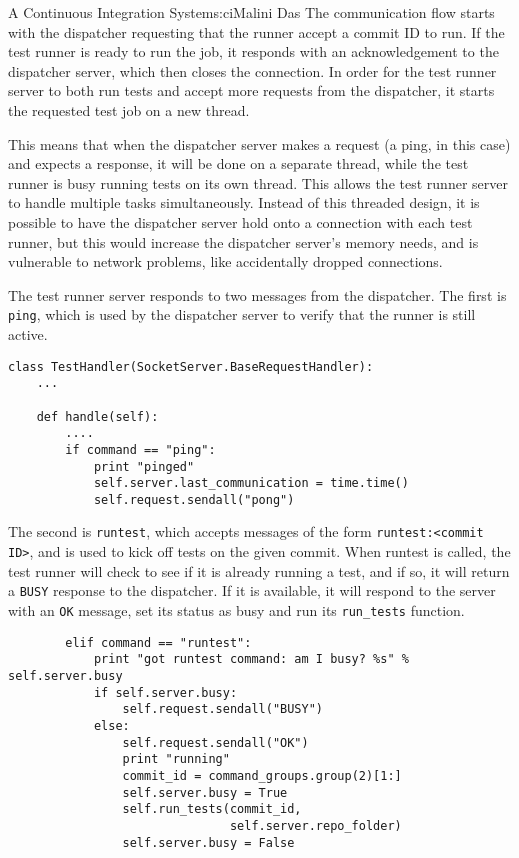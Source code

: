 \begin{aosachapter}{A Continuous Integration System}{s:ci}{Malini Das}
The communication flow starts with the dispatcher requesting that the
runner accept a commit ID to run. If the test runner is ready to run the
job, it responds with an acknowledgement to the dispatcher server, which
then closes the connection. In order for the test runner server to both
run tests and accept more requests from the dispatcher, it starts the
requested test job on a new thread.

This means that when the dispatcher server makes a request (a ping, in
this case) and expects a response, it will be done on a separate thread,
while the test runner is busy running tests on its own thread. This
allows the test runner server to handle multiple tasks simultaneously.
Instead of this threaded design, it is possible to have the dispatcher
server hold onto a connection with each test runner, but this would
increase the dispatcher server's memory needs, and is vulnerable to
network problems, like accidentally dropped connections.

The test runner server responds to two messages from the dispatcher. The
first is \texttt{ping}, which is used by the dispatcher server to verify
that the runner is still active.

\begin{verbatim}
class TestHandler(SocketServer.BaseRequestHandler):
    ...

    def handle(self):
        ....
        if command == "ping":
            print "pinged"
            self.server.last_communication = time.time()
            self.request.sendall("pong")
\end{verbatim}

The second is \texttt{runtest}, which accepts messages of the form
\texttt{runtest:\textless{}commit ID\textgreater{}}, and is used to kick
off tests on the given commit. When runtest is called, the test runner
will check to see if it is already running a test, and if so, it will
return a \texttt{BUSY} response to the dispatcher. If it is available,
it will respond to the server with an \texttt{OK} message, set its
status as busy and run its \texttt{run\_tests} function.

\begin{verbatim}
        elif command == "runtest":
            print "got runtest command: am I busy? %s" % self.server.busy
            if self.server.busy:
                self.request.sendall("BUSY")
            else:
                self.request.sendall("OK")
                print "running"
                commit_id = command_groups.group(2)[1:]
                self.server.busy = True
                self.run_tests(commit_id,
                               self.server.repo_folder)
                self.server.busy = False
\end{verbatim}


\end{aosachapter}
